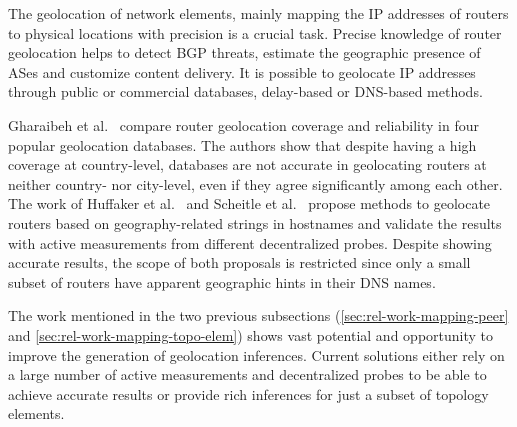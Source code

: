 	The geolocation of network elements, mainly mapping the IP addresses of routers to physical locations with precision is a crucial task. Precise knowledge of router geolocation helps to detect BGP threats, estimate the geographic presence of ASes and customize content delivery. It is possible to geolocate IP addresses through public or commercial databases, delay-based or DNS-based methods.

	Gharaibeh et al.~\cite{Gharaibeh:2017:LRG:3131365.3131380} compare router geolocation coverage and reliability in four popular geolocation databases. The authors show that despite having a  high coverage at country-level, databases are not accurate in geolocating routers at neither country- nor city-level, even if they agree significantly among each other. The work of Huffaker et al.~\cite{Huffaker:2014:DDR:2656877.2656879} and Scheitle et al.~\cite{8002903} propose methods to geolocate routers based on geography-related strings in hostnames and validate the results with active measurements from different decentralized probes. Despite showing accurate results, the scope of both proposals is restricted since only a small subset of routers have apparent geographic hints in their DNS names.

	The work mentioned in the two previous subsections (\ref{sec:rel-work-mapping-peer} and \ref{sec:rel-work-mapping-topo-elem}) shows vast potential and opportunity to improve the generation of geolocation inferences. Current solutions either rely on a large number of active measurements and decentralized probes to be able to achieve accurate results or provide rich inferences for just a subset of topology elements.


